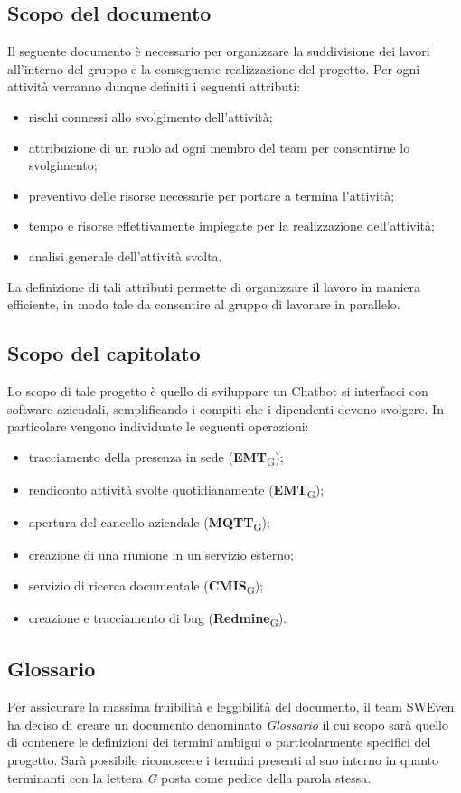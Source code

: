 \subsection{Scopo del documento}
Il seguente documento è necessario per organizzare la suddivisione dei lavori all'interno del gruppo e la conseguente realizzazione del progetto. Per ogni attività verranno dunque definiti i seguenti attributi: 
\begin{itemize}
    \item rischi connessi allo svolgimento dell'attività;
    \item attribuzione di un ruolo ad ogni membro del team per consentirne lo svolgimento;
    \item preventivo delle risorse necessarie per portare a termina l'attività;
    \item tempo e risorse effettivamente impiegate per la realizzazione dell'attività;
    \item analisi generale dell'attività svolta.
\end{itemize}
La definizione di tali attributi permette di organizzare il lavoro in maniera efficiente, in modo tale da consentire al gruppo di lavorare in parallelo. 

\subsection{Scopo del capitolato}
Lo scopo di tale progetto è quello di sviluppare un Chatbot si interfacci con software aziendali, semplificando i compiti che i dipendenti devono svolgere. 
In particolare vengono individuate le seguenti operazioni: 
\begin{itemize}
    \item tracciamento della presenza in sede (\textbf{EMT}\textsubscript{G});
    \item rendiconto attività svolte quotidianamente (\textbf{EMT}\textsubscript{G});
    \item apertura del cancello aziendale (\textbf{MQTT}\textsubscript{G});
    \item creazione di una riunione in un servizio esterno;
    \item servizio di ricerca documentale (\textbf{CMIS}\textsubscript{G});
    \item creazione e tracciamento di bug (\textbf{Redmine}\textsubscript{G}).
\end{itemize}

\subsection{Glossario}
Per assicurare la massima fruibilità e leggibilità del documento, il team SWEven ha deciso di creare un documento denominato \textit{Glossario} il cui scopo sarà quello di contenere le definizioni dei termini ambigui o particolarmente specifici del progetto. Sarà possibile riconoscere i termini presenti al suo interno in quanto terminanti con la lettera \textit{G} posta come pedice della parola stessa. 
